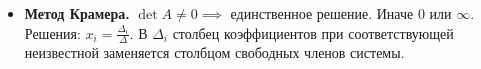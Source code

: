 \begin{itemize}
\begin{multline*}
    \right| = a_{1}b_{2}c_{3} + a_{3}b_{1}c_{2} + a_{2}b_{3}c_{1} -\\- a_{3}b_{2}c_{1} - a_{1}b_{3}c_{2} - a_{2}b_{1}c_{3}
    \end{multline*}
    $\Delta = \sum_{j = 1}^{n} (-1)^{j + 1} \cdot a_{1, j} \cdot \bar{M_{j}^{1}}$, $\bar{M_{j}^{1}}$ --- определитель матрицы, полученной вычеркиванием $1$ строки и $j$ стоблца.
    \item \textbf{Метод Крамера.} $\det A \neq 0 \implies$ единственное решение. Иначе $0$ или $\infty$.
    Решения: $\displaystyle x_{i} = \frac{\Delta_{i}}{\Delta}$. В $\Delta_{i}$ столбец коэффициентов при соответствующей неизвестной заменяется столбцом свободных членов системы.
\end{itemize}
